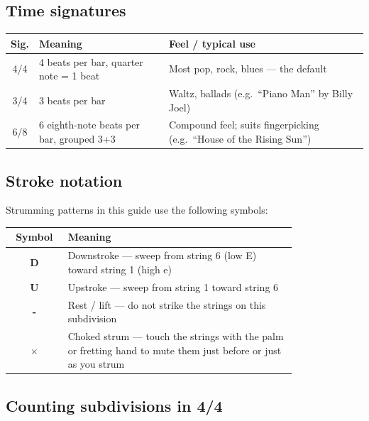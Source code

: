 \documentclass[a4paper,10pt]{article}
\begin{document}
\subsection{Time signatures}

\begin{center}\small\setlength{\tabcolsep}{0.7em}\renewcommand{\arraystretch}{1.4}
\begin{tabular}{cll}
\toprule
\textbf{Sig.} & \textbf{Meaning} & \textbf{Feel / typical use} \\
\midrule
4/4 & 4 beats per bar, quarter note = 1 beat
    & Most pop, rock, blues --- the default \\
3/4 & 3 beats per bar
    & Waltz, ballads (e.g.\ ``Piano Man'' by Billy Joel) \\
6/8 & 6 eighth-note beats per bar, grouped 3+3
    & Compound feel; suits fingerpicking (e.g.\ ``House of the Rising Sun'') \\
\bottomrule
\end{tabular}
\end{center}

\subsection{Stroke notation}

\noindent
Strumming patterns in this guide use the following symbols:

\medskip
\begin{center}\small\setlength{\tabcolsep}{1.0em}\renewcommand{\arraystretch}{1.4}
\begin{tabular}{c>{\raggedright\arraybackslash}p{0.8\linewidth}}
\toprule
\textbf{Symbol} & \textbf{Meaning} \\
\midrule
\textbf{D} & Downstroke --- sweep from string 6 (low E) toward string 1 (high e) \\
\textbf{U} & Upstroke --- sweep from string 1 toward string 6 \\
\textbf{-} & Rest / lift --- do not strike the strings on this subdivision \\
\textbf{$\times$} & Choked strum --- touch the strings with the palm or fretting hand
                    to mute them just before or just as you strum \\
\bottomrule
\end{tabular}
\end{center}

\subsection{Counting subdivisions in 4/4}
\end{document}
